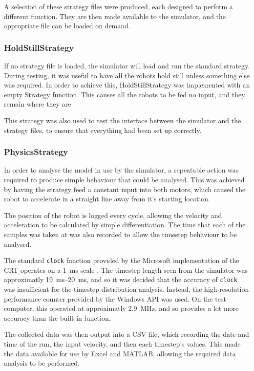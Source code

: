 \documentclass[10pt]{article} \usepackage[a4paper]{geometry}
\begin{document}
A selection of these strategy files were produced, each designed to perform a
different function.  They are then made available to the simulator, and the
appropriate file can be loaded on demand.

\subsubsection{HoldStillStrategy}

If no strategy file is loaded, the simulator will load and run the standard
strategy.  During testing, it was useful to have all the robots hold still
unless something else was required.  In order to achieve this, HoldStillStrategy
was implemented with an empty Strategy function.  This causes all the robots to
be fed no input, and they remain where they are.

This strategy was also used to test the interface between the simulator and the
strategy files, to ensure that everything had been set up correctly.

\subsubsection{PhysicsStrategy}

In order to analyse the model in use by the simulator, a repeatable
action was required to produce simple behaviour that could be analysed.  This
was achieved by having the strategy feed a constant input into both motors,
which caused the robot to accelerate in a straight line away from it's starting
location.

The position of the robot is logged every cycle, allowing the velocity and
acceleration to be calculated by simple differentiation.  The time that each of
the samples was taken at was also recorded to allow the timestep behaviour to be
analysed.

The standard \texttt{clock} function provided by the Microsoft implementation of
the \ac{CRT} operates on a \SI{1}{\milli\second} scale \cite{windowsSDK}.  The
timestep length seen from the simulator was approximatly
\SIrange{19}{20}{\milli\second}, and so it was decided that the accuracy of
\texttt{clock} was insufficient for the timestep distribution analysis.
Instead, the high-resolution performance counter provided by the Windows API was
used.  On the test computer, this operated at approximatly
\SI{2.9}{\mega\hertz}, and so provides a lot more accuracy than the built in
function.  

The collected data was then output into a \ac{CSV} file, which recording the
date and time of the run, the input velocity, and then each timestep's values. 
This made the data available for use by Excel and MATLAB, allowing the required
data analysis to be performed.
\end{document}
